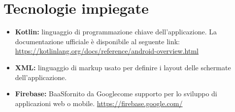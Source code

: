\section{Tecnologie impiegate}
\begin{itemize}
	\item \textbf{Kotlin\glosp:} linguaggio di programmazione chiave dell'applicazione. La documentazione ufficiale è disponibile al seguente link:
	\newline \url{https://kotlinlang.org/docs/reference/android-overview.html}
	\item \textbf{XML\glosp:} linguaggio di markup usato per definire i layout delle schermate dell'applicazione.
	\item \textbf{Firebase\glosp:} BaaS\glosp fornito da Google\glosp come supporto per lo sviluppo di applicazioni web o mobile.
	\newline \url{https://firebase.google.com/}
\end{itemize}
